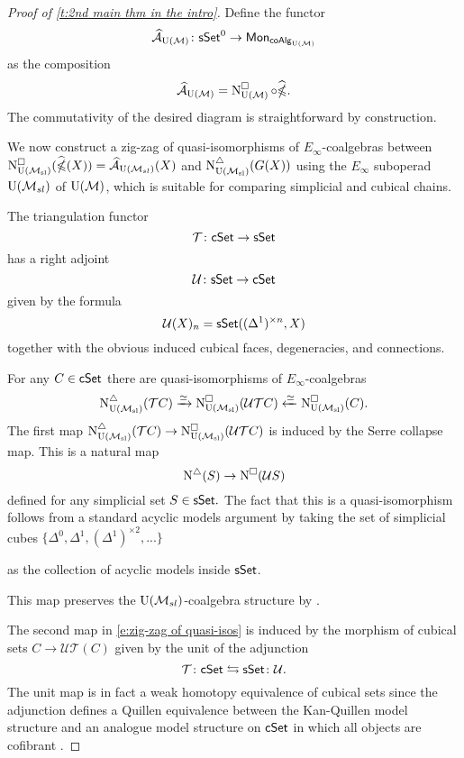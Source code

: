 \begin{proof}[Proof of \cref{t:2nd main thm in the intro}]
	Define the functor
	$$\operatorname{\mathcal{\widehat{A}}}_{{\operatorname{U}(\mathcal{M})}} \colon \mathsf{sSet}^0 \to \mathsf{Mon}_{\mathsf{coAlg}_{{\operatorname{U}(\mathcal{M})}}}$$
	as the composition
	$$\operatorname{\mathcal{\widehat{A}}}_{{\operatorname{U}(\mathcal{M})}} = \operatorname{N^{\square}_{{\operatorname{U}(\mathcal{M})}}} \circ \widehat{\operatorname{\mathbb{\Omega}}}.$$
	The commutativity of the desired diagram is straightforward by construction.
	
	We now construct a zig-zag of quasi-isomorphisms of $E_{\infty}$-coalgebras between $\operatorname{N^{\square}_{{\operatorname{U}(\mathcal{M}_{sl})}}}(\widehat{\operatorname{\mathbb{\Omega}}}(X)) = \operatorname{\mathcal{\widehat{A}}}_{{\operatorname{U}(\mathcal{M}_{sl})}}(X)$ and $\operatorname{N^{\triangle}_{{\operatorname{U}(\mathcal{M}_{sl})}}} (G(X))$ using the $E_{\infty}$ suboperad ${\operatorname{U}(\mathcal{M}_{sl})}$ of ${\operatorname{U}(\mathcal{M})}$, which is suitable for comparing simplicial and cubical chains.
	
	The triangulation functor $$\mathcal{T}\colon \mathsf{cSet} \to \mathsf{sSet}$$
	has a right adjoint $$\mathcal{U}\colon \mathsf{sSet} \to \mathsf{cSet}$$
	given by the formula
	$$\mathcal{U}(X)_n= \mathsf{sSet}((\Delta^1)^{\times n}, X)$$
	together with the obvious induced cubical faces, degeneracies, and connections.
	
	
	For any $C \in \mathsf{cSet}$ there are quasi-isomorphisms of $E_{\infty}$-coalgebras
	\begin{equation} \label{e:zig-zag of quasi-isos}
	\operatorname{N^{\triangle}_{{\operatorname{U}(\mathcal{M}_{sl})}}}(\mathcal{T}C) \xrightarrow{\simeq}
	\operatorname{N^{\square}_{{\operatorname{U}(\mathcal{M}_{sl})}}}(\mathcal{U}\mathcal{T}C) \xleftarrow{\simeq}
	\operatorname{N^{\square}_{{\operatorname{U}(\mathcal{M}_{sl})}}}(C).
	\end{equation}	
	The first map $\operatorname{N^{\triangle}_{{\operatorname{U}(\mathcal{M}_{sl})}}}(\mathcal{T}C) \to \operatorname{N^{\square}_{{\operatorname{U}(\mathcal{M}_{sl})}}}(\mathcal{U}\mathcal{T}C)$ is induced by the Serre collapse map.
	This is a natural map
	$$\operatorname{N^{\triangle}}(S) \to \operatorname{N^{\square}}(\mathcal{U}S)$$
	defined for any simplicial set $S \in \mathsf{sSet}.$
	The fact that this is a quasi-isomorphism follows from a standard acyclic models argument by taking the set of simplicial cubes $\{ \Delta^0, \Delta^1, (\Delta^1)^{\times 2}, ...\}$
	
	
	as the collection of acyclic models inside $\mathsf{sSet}$.
	
	This map preserves the ${\operatorname{U}(\mathcal{M}_{sl})}$-coalgebra structure by \cite{medina2021cubical}.
	
	The second map in \eqref{e:zig-zag of quasi-isos} is induced by the morphism of cubical sets $C \to \mathcal{U} \mathcal{T} (C)$ given by the unit of the adjunction
	$$\mathcal{T} \colon \mathsf{cSet} \leftrightarrows \mathsf{sSet} \colon \mathcal{U}.$$
	The unit map is in fact a weak homotopy equivalence of cubical sets since the adjunction defines a Quillen equivalence between the Kan-Quillen model structure and an analogue model structure on $\mathsf{cSet}$ in which all objects are cofibrant \cite{cisinski}.
	

\end{proof}
